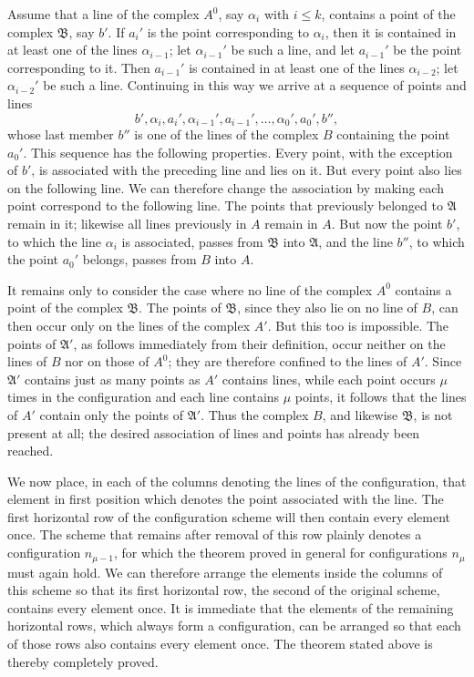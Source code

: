 \documentclass[11pt]{article}
\begin{document}
Assume that a line of the complex $A^0$, say $\alpha_i$ with $i\leq k$, contains a point of the complex $\mathfrak B$, say $b'$. If $a_i'$ is the point corresponding to $\alpha_i$, then it is contained in at least one of the lines $\alpha_{i-1}$; let $\alpha_{i-1}'$ be such a line, and let $a_{i-1}'$ be the point corresponding to it. Then $a_{i-1}'$ is contained in at least one of the lines $\alpha_{i-2}$; let $\alpha_{i-2}'$ be such a line. Continuing in this way we arrive at a sequence of points and lines
\[
 b',\alpha_i,a_i',\alpha_{i-1}',a_{i-1}',\ldots,\alpha_0',a_0',b'',
\]
whose last member $b''$ is one of the lines of the complex $B$ containing the point $a_0'$. This sequence has the following properties. Every point, with the exception of $b'$, is associated with the preceding line and lies on it. But every point also lies on the following line. We can therefore change the association by making each point correspond to the following line. The points that previously belonged to $\mathfrak A$ remain in it; likewise all lines previously in $A$ remain in $A$. But now the point $b'$, to which the line $\alpha_i$ is associated, passes from $\mathfrak B$ into $\mathfrak A$, and the line $b''$, to which the point $a_0'$ belongs, passes from $B$ into $A$.

It remains only to consider the case where no line of the complex $A^0$ contains a point of the complex $\mathfrak B$. The points of $\mathfrak B$, since they also lie on no line of $B$, can then occur only on the lines of the complex $A'$. But this too is impossible. The points of $\mathfrak A'$, as follows immediately from their definition, occur neither on the lines of $B$ nor on those of $A^0$; they are therefore confined to the lines of $A'$. Since $\mathfrak A'$ contains just as many points as $A'$ contains lines, while each point occurs $\mu$ times in the configuration and each line contains $\mu$ points, it follows that the lines of $A'$ contain only the points of $\mathfrak A'$. Thus the complex $B$, and likewise $\mathfrak B$, is not present at all; the desired association of lines and points has already been reached.

We now place, in each of the columns denoting the lines of the configuration, that element in first position which denotes the point associated with the line. The first horizontal row of the configuration scheme will then contain every element once. The scheme that remains after removal of this row plainly denotes a configuration $n_{\mu-1}$, for which the theorem proved in general for configurations $n_\mu$ must again hold. We can therefore arrange the elements inside the columns of this scheme so that its first horizontal row, the second of the original scheme, contains every element once. It is immediate that the elements of the remaining horizontal rows, which always form a configuration, can be arranged so that each of those rows also contains every element once. The theorem stated above is thereby completely proved.
\end{document}

